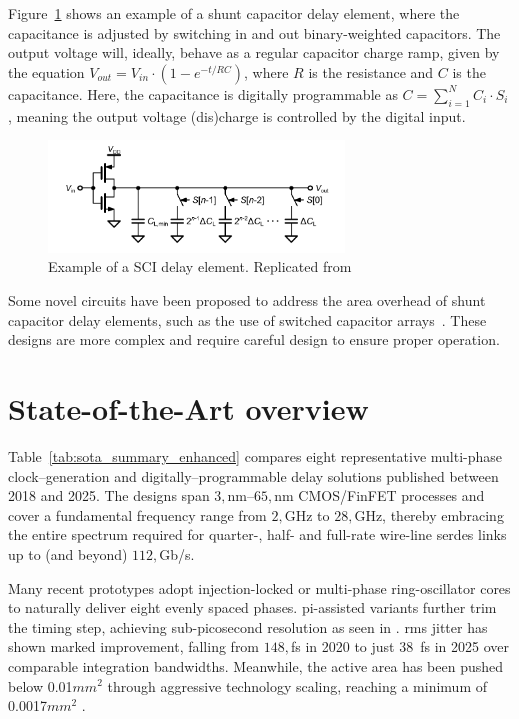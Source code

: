 Figure~\ref{fig:sci_delay_eg} shows an example of a shunt capacitor delay element, where the capacitance is adjusted by switching in and out binary-weighted capacitors. The output voltage will, ideally, behave as a regular capacitor charge ramp, given by the equation $ V_{out} = V_{in} \cdot (1 - e^{-t/RC}) $, where $ R $ is the resistance and $ C $ is the capacitance. Here, the capacitance is digitally programmable as \(C = \sum_{i=1}^{N} C_i \cdot S_i\), meaning the output voltage (dis)charge is controlled by the digital input.

\begin{figure}[htbp]
    \centering
    \includegraphics[width=0.7\textwidth]{figures/Schematics/SCI_delay_example.png}
    \caption{Example of a SCI delay element. Replicated from~\protect\cite{Angeli_2018}}\label{fig:sci_delay_eg}
\end{figure}

Some novel circuits have been proposed to address the area overhead of shunt capacitor delay elements, such as the use of switched capacitor arrays~\cite{Ramazanoglu2018switched}. These designs are more complex and require careful design to ensure proper operation.

\section{State-of-the-Art overview}
Table~\ref{tab:sota_summary_enhanced} compares eight representative multi-phase clock–generation and digitally–programmable delay solutions published between 2018 and 2025. The designs span $3,$nm–$65,$nm CMOS/FinFET processes and cover a fundamental frequency range from $2,$GHz to $28,$GHz, thereby embracing the entire spectrum required for quarter-, half- and full-rate wire-line \gls{serdes} links up to (and beyond) $112,$Gb/s.

Many recent prototypes adopt injection-locked or multi-phase ring-oscillator cores to naturally deliver eight evenly spaced phases. \gls{pi}-assisted variants further trim the timing step, achieving sub-picosecond resolution as seen in \cite{Mishra2022ISSCC}. \gls{rms} jitter has shown marked improvement, falling from $148,$fs in 2020 \cite{Chen2020VLSIC} to just 38~fs in 2025 \cite{Tian2025ISSCC} over comparable integration bandwidths. Meanwhile, the active area has been pushed below 0.01\(mm^2\) through aggressive technology scaling, reaching a minimum of 0.0017\(mm^2\) \cite{Chen2020VLSIC}.

